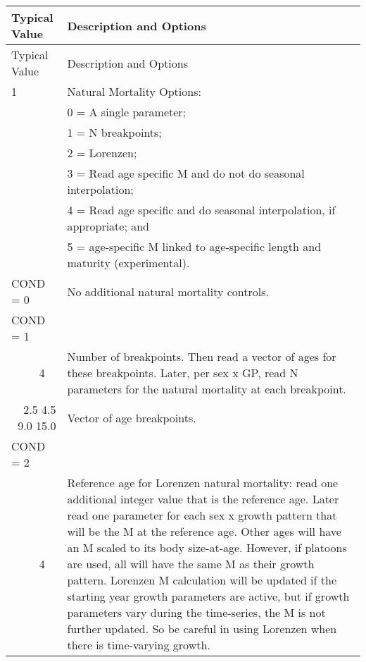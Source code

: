 \begin{longtable}{p{0.5cm} p{2cm} p{12.75cm}}
	\hline	
	\multicolumn{2}{l}{Typical Value} & Description and Options\Tstrut\Bstrut\\
	\hline
	\endfirsthead

	\hline
	\multicolumn{2}{l}{Typical Value} & Description and Options\Tstrut\Bstrut\\
	\hline
	\endhead
	\hline

	\endfoot
	
	\endlastfoot

	1 & & Natural Mortality Options:\Tstrut\\
	  & & 0 = A single parameter;\\
	  & & 1 = N breakpoints;\\
	  & & 2 = Lorenzen; \\
	  & & 3 = Read age specific M and do not do seasonal interpolation;\\
	  & & 4 = Read age specific and do seasonal interpolation, if appropriate; and\\
	  & & 5 = age-specific M linked to age-specific length and maturity (experimental). \Bstrut\\
	\hline

	\multicolumn{2}{l}{COND = 0} & No additional natural mortality controls. \Tstrut\Bstrut\\
	\hline

	\multicolumn{2}{l}{COND = 1} & \Tstrut\Bstrut\\
	& 4 & Number of breakpoints.  Then read a vector of ages for these breakpoints. Later, per sex x GP, read N parameters for the natural mortality at each breakpoint.\\

	\multicolumn{2}{r}{2.5 4.5 9.0 15.0} & Vector of age breakpoints. \Bstrut\\
	\hline
	
	\multicolumn{2}{l}{COND = 2} & \Tstrut\\
	& 4 \Tstrut & Reference age for Lorenzen natural mortality: read one additional integer value that is the reference age. Later read one parameter for each sex x growth pattern that will be the M at the reference age.  Other ages will have an M scaled to its body size-at-age.  However, if platoons are used, all will have the same M as their growth pattern.  Lorenzen M calculation will be updated if the starting year growth parameters are active, but if growth parameters vary during the time-series, the M is not further updated.  So be careful in using Lorenzen when there is time-varying growth.\\
	\hline
	

\end{longtable}
